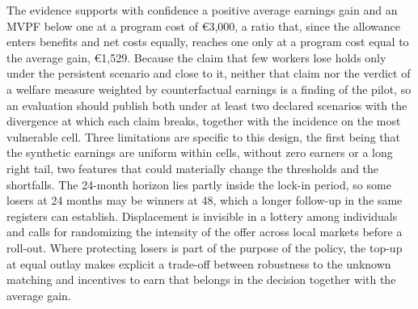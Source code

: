 \documentclass[11pt,a4paper]{article}
\begin{document}
The evidence supports with confidence a positive average earnings gain and an MVPF below one at a program cost of €3,000, a ratio that, since the allowance enters benefits and net costs equally, reaches one only at a program cost equal to the average gain, €1,529. Because the claim that few workers lose holds only under the persistent scenario and close to it, neither that claim nor the verdict of a welfare measure weighted by counterfactual earnings is a finding of the pilot, so an evaluation should publish both under at least two declared scenarios with the divergence at which each claim breaks, together with the incidence on the most vulnerable cell. Three limitations are specific to this design, the first being that the synthetic earnings are uniform within cells, without zero earners or a long right tail, two features that could materially change the thresholds and the shortfalls. The 24-month horizon lies partly inside the lock-in period, so some losers at 24 months may be winners at 48, which a longer follow-up in the same registers can establish. Displacement is invisible in a lottery among individuals and calls for randomizing the intensity of the offer across local markets before a roll-out. Where protecting losers is part of the purpose of the policy, the top-up at equal outlay makes explicit a trade-off between robustness to the unknown matching and incentives to earn that belongs in the decision together with the average gain.
\newpage
\end{document}
